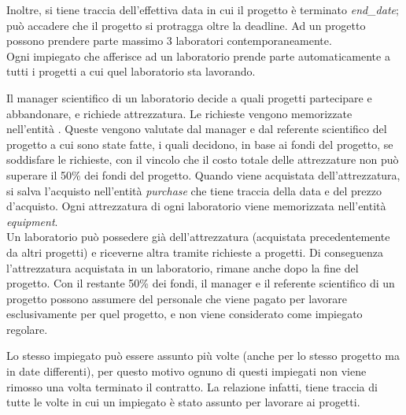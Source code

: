 Inoltre, si tiene traccia dell'effettiva data in cui il progetto è terminato \textit{end\_date}; può accadere che il progetto si protragga oltre la deadline.\sskip
Ad un progetto possono prendere parte massimo 3 laboratori contemporaneamente.\\
Ogni impiegato che afferisce ad un laboratorio prende parte automaticamente a tutti i progetti a cui quel laboratorio sta lavorando.

Il manager scientifico di un laboratorio decide a quali progetti partecipare e abbandonare, e richiede attrezzatura.\sskip
Le richieste vengono memorizzate nell'entità \textit{\equipmentrequest}.
Queste vengono valutate dal manager e dal referente scientifico del progetto a cui sono state fatte, i quali decidono, in base ai fondi del progetto, se soddisfare le richieste, con il vincolo che il costo totale delle attrezzature non può superare il 50\% dei fondi del progetto.\sskip
Quando viene acquistata dell'attrezzatura, si salva l'acquisto nell'entità \textit{purchase} che tiene traccia della data e del prezzo d'acquisto.\sskip
Ogni attrezzatura di ogni laboratorio viene memorizzata nell'entità \textit{equipment}.\\
Un laboratorio può possedere già dell'attrezzatura (acquistata precedentemente da altri progetti) e riceverne altra tramite richieste a progetti. Di conseguenza l'attrezzatura acquistata in un laboratorio, rimane anche dopo la fine del progetto.\sskip
Con il restante 50\% dei fondi, il manager e il referente scientifico di un progetto possono assumere del personale che viene pagato per lavorare esclusivamente per quel progetto, e non viene considerato come impiegato regolare.

Lo stesso impiegato può essere assunto più volte (anche per lo stesso progetto ma in date differenti), per questo motivo ognuno di questi impiegati non viene rimosso una volta terminato il contratto.
La relazione \textit{\workson} infatti, tiene traccia di tutte le volte in cui un impiegato è stato assunto per lavorare ai progetti.


